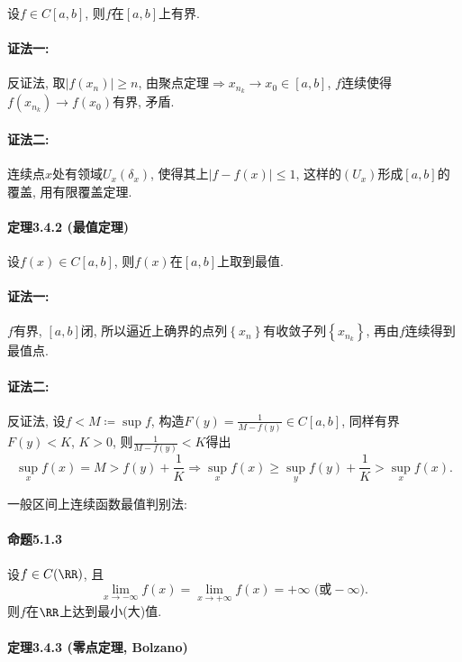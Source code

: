 设$f\in C[a,b]$, 则$f$在$[a,b]$上有界.

\paragraph{证法一:}

反证法, 取$\left|f(x_{n})\right|\ge n$, 由聚点定理$\Longrightarrow x_{n_{k}}\to x_{0}\in[a,b]$,
$f$连续使得$f(x_{n_{k}})\to f(x_{0})$有界, 矛盾.

\paragraph{证法二:}

连续点$x$处有领域$U_{x}(\delta_{x})$, 使得其上$\left|f-f(x)\right|\le1$, 这样的$\left(U_{x}\right)$形成$[a,b]$的覆盖,
用有限覆盖定理.

\paragraph{定理3.4.2 (最值定理)}

设$f(x)\in C[a,b]$, 则$f(x)$在$[a,b]$上取到最值.

\paragraph{证法一:}

$f$有界, $[a,b]$闭, 所以逼近上确界的点列$\left\{ x_{n}\right\} $有收敛子列$\left\{ x_{n_{k}}\right\} $,
再由$f$连续得到最值点.

\paragraph{证法二:}

反证法, 设$f<M\coloneqq\sup f$, 构造$F(y)=\frac{1}{M-f(y)}\in C[a,b]$,
同样有界$F(y)<K$, $K>0$, 则$\frac{1}{M-f(y)}<K$得出
\[
\sup_{x}f(x)=M>f(y)+\frac{1}{K}\Longrightarrow\sup_{x}f(x)\ge\sup_{y}f(y)+\frac{1}{K}>\sup_{x}f(x).
\]

一般区间上连续函数最值判别法:

\paragraph{命题5.1.3}

设$f\in C(\RR)$, 且
\[
\lim_{x\to-\infty}f(x)=\lim_{x\to+\infty}f(x)=+\infty\text{ (或}-\infty\text{)}.
\]
则$f$在$\RR$上达到最小(大)值.

\paragraph{定理3.4.3 (零点定理, Bolzano)}

